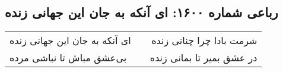 \begin{center}
\section*{رباعی شماره ۱۶۰۰: ای آنکه به جان این جهانی زنده}
\label{sec:1600}
\begin{longtable}{l p{0.5cm} r}
ای آنکه به جان این جهانی زنده
&&
شرمت بادا چرا چنانی زنده
\\
بی‌عشق مباش تا نباشی مرده
&&
در عشق بمیر تا بمانی زنده
\\
\end{longtable}
\end{center}
